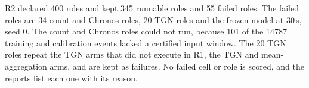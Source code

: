 R2 declared 400 roles and kept 345 runnable roles and 55 failed roles.
The failed roles are 34 count and Chronos roles, 20 TGN roles and the frozen model at 30\,s, seed 0.
The count and Chronos roles could not run, because 101 of the \num{14787} training and calibration events lacked a certified input window.
The 20 TGN roles repeat the TGN arms that did not execute in R1, the TGN and mean-aggregation arms, and are kept as failures.
No failed cell or role is scored, and the reports list each one with its reason.


